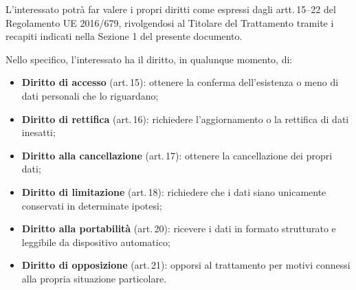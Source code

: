 \documentclass[legal]{../core/polinetwork}
\begin{document}
L'interessato potrà far valere i propri diritti come espressi dagli artt.\,15--22
del Regolamento UE 2016/679, rivolgendosi al Titolare del Trattamento tramite
i recapiti indicati nella Sezione 1 del presente documento.

Nello specifico, l'interessato ha il diritto, in qualunque momento, di:

\begin{itemize}
  \item \textbf{Diritto di accesso} (art.\,15): ottenere la conferma
    dell'esistenza o meno di dati personali che lo riguardano;
  \item \textbf{Diritto di rettifica} (art.\,16): richiedere l'aggiornamento
    o la rettifica di dati inesatti;
  \item \textbf{Diritto alla cancellazione} (art.\,17): ottenere la cancellazione
    dei propri dati;
  \item \textbf{Diritto di limitazione} (art.\,18): richiedere che i dati siano
    unicamente conservati in determinate ipotesi;
  \item \textbf{Diritto alla portabilità} (art.\,20): ricevere i dati in formato
    strutturato e leggibile da dispositivo automatico;
  \item \textbf{Diritto di opposizione} (art.\,21): opporsi al trattamento
    per motivi connessi alla propria situazione particolare.
\end{itemize}



\vfill
\pnContactBlock
\end{document}
